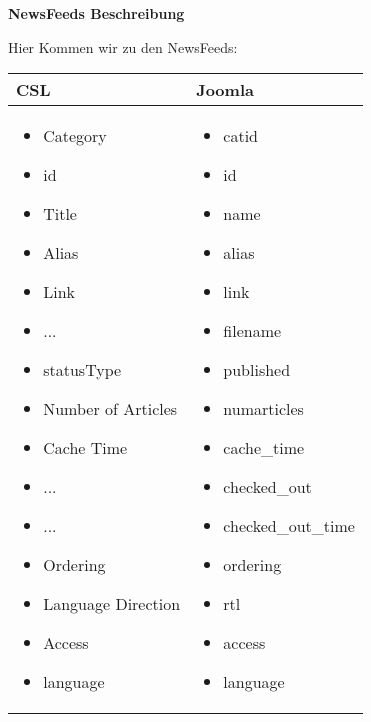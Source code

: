 \textbf{NewsFeeds Beschreibung}

Hier Kommen wir zu den NewsFeeds:

\begin{minipage}{0.7\textwidth}
\begin{tabular}{|p{} | p{}|}
\hline
\textbf{CSL} & \textbf{Joomla} \\ 
\hline
\begin{itemize}
\item Category
 \item  id
 \item  Title
 \item  Alias
 \item  Link
 \item  ...
 \item  statusType
 \item  Number of Articles
 \item  Cache Time
 \item  ...
 \item  ...
 \item  Ordering
 \item  Language Direction
 \item  Access
 \item  language
 
\end{itemize}
 & 
\begin{itemize}
 \item catid
 \item  id
 \item  name
 \item  alias
 \item  link
 \item  filename
 \item  published
 \item  numarticles
 \item  cache\_time
 \item  checked\_out
 \item  checked\_out\_time
 \item  ordering
 \item  rtl
 \item  access
 \item  language
 
\end{itemize}
\\
\hline
\end{tabular}
\end{minipage}

